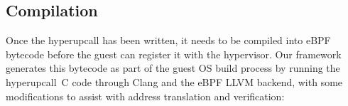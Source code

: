 \documentclass[11pt]{article}
\newcommand{\hypercallback}{hyperupcall\xspace{}}
\newcommand{\hide}[1]{}
\begin{document}
%
%

\hide{vmalloc, memory hot-add}

\subsection{Compilation}
\label{sec:compilation}

Once the \hypercallback{} has been written, it needs to be compiled into
eBPF bytecode before the guest can register it with the hypervisor. Our
framework generates this bytecode as part of the guest OS build process by
running the \hypercallback~C code through Clang and the eBPF LLVM backend,
with some modifications to assist with address translation and verification:



\end{document}
